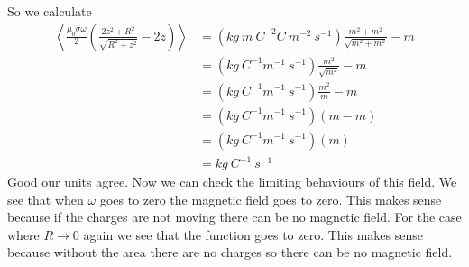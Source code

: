 \documentclass[11pt]{article}
\numberwithin{equation}{section}
\begin{document}
So we calculate
\begin{align*}
\left<\frac{\mu_0\sigma\omega}{2}\left(\frac{2z^2+R^2}{\sqrt{R^2+z^2}}-2z\right)\right> &=  (kg\ m\ C^{-2} C\ m^{-2}\ s^{-1})\frac{m^2+m^2}{\sqrt{m^2+m^2}}-m\\
&= (kg\ C^{-1} m^{-1}\ s^{-1})\frac{m^2}{\sqrt{m^2}}-m\\
&= (kg\ C^{-1} m^{-1}\ s^{-1})\frac{m^2}{m}-m\\
&= (kg\ C^{-1} m^{-1}\ s^{-1})(m-m)\\
&= (kg\ C^{-1} m^{-1}\ s^{-1})(m)\\
&= kg\ C^{-1}\ s^{-1}
\end{align*}
Good our units agree. Now we can check the limiting behaviours of this field. We see that when $\omega$ goes to zero the magnetic field goes to zero. This makes sense because if the charges are not moving there can be no magnetic field. For the case where $R\rightarrow0$ again we see that the function goes to zero. This makes sense because without the area there are no charges so there can be no magnetic field.
\end{document}
